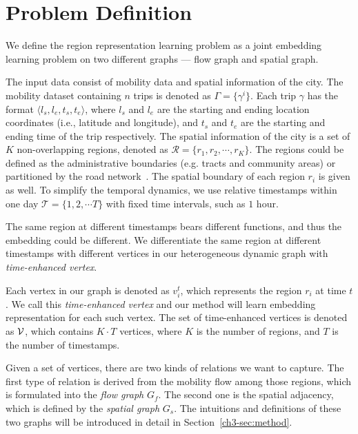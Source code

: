 \section{Problem Definition}
\label{ch3-sec:definition}


We define the region representation learning problem as a joint embedding learning problem on two different graphs --- flow graph and spatial graph.


The input data consist of mobility  data and spatial information of the city. The mobility dataset containing $n$ trips is denoted as $\Gamma = \{ \gamma^i \}$. Each trip $\gamma$ has the format $\langle l_s, l_e, t_s, t_e \rangle$, where $l_s$ and $l_e$ are the starting and ending location coordinates (i.e., latitude and longitude), and $t_s$ and $t_e$ are the starting and ending time of the trip respectively. The spatial information of the city is a set of $K$ non-overlapping regions, denoted as $\mathcal{R} = \{ r_1, r_2, \cdots, r_K \}$. The regions could be defined as the administrative boundaries (e.g. tracts and community areas) or partitioned by the road network~\cite{yuan2012discovering}. The spatial boundary of each region $r_i$ is given as well. To simplify the temporal dynamics, we use relative timestamps within one day $\mathcal{T} = \{ 1, 2, \cdots T\}$ with fixed time intervals, such as $1$ hour.


The same region at different timestamps bears different functions, and thus the embedding could be different. We differentiate the same region at different timestamps with different vertices in our heterogeneous dynamic graph with \emph{time-enhanced vertex}. 


\begin{definition}
Each vertex in our graph is denoted as $v_i^t$, which represents the region $r_i$ at time $t$. We call this \emph{time-enhanced vertex} and our method will learn embedding representation for each such vertex. The set of time-enhanced vertices is denoted as $\mathcal{V}$, which contains $K \cdot T$ vertices, where $K$ is the number of regions, and $T$ is the number of timestamps.
\end{definition}


Given a set of vertices, there are two kinds of relations we want to capture. The first type of relation is derived from the mobility flow among those regions, which is formulated into the \emph{flow graph} $G_f$. The second one is the spatial adjacency, which is defined by the \emph{spatial graph} $G_s$. The intuitions and definitions of these two graphs will be introduced in detail in Section~\ref{ch3-sec:method}.


